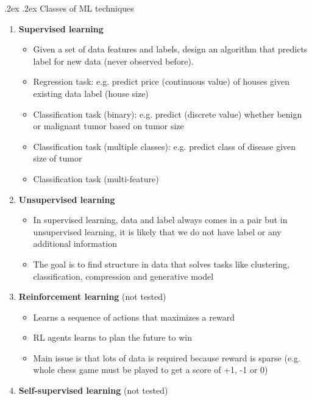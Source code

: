 \documentclass[landscape,a4paper]{article}
\makeatletter
\renewcommand{\subsection}{\@startsection{subsection}{1}{0mm}%
	{.2ex}%
	{.2ex}%
	{\sffamily\bfseries}}
\makeatother
\begin{document}
\begin{multicols*}{4}
		\subsection{Classes of ML techniques}
		\begin{enumerate}
			\item \textbf{Supervised learning}
			\begin{itemize}
				\item Given a set of data features and labels, design an algorithm that predicts label for
				new data (never observed before).
				\item Regression task: e.g. predict price (continuous value) of houses given existing data label (house size)
				\item Classification task (binary): e.g. predict (discrete value) whether benign or malignant tumor based on tumor size
				\item Classification task (multiple classes): e.g. predict class of disease given size of tumor
				\item Classification task (multi-feature)
			\end{itemize}
			\item \textbf{Unsupervised learning}
			\begin{itemize}
				\item In supervised learning, data and label always comes in a pair but in unsupervised learning, it is likely that we do not have label or any additional information
				\item The goal is to find structure in data that solves tasks like clustering, classification, compression and generative model
			\end{itemize}
			\item \textbf{Reinforcement learning} (not tested)
			\begin{itemize}
				\item Learns a sequence of actions that maximizes a reward
				\item RL agents learns to plan the future to win
				\item Main issue is that lots of data is required because reward is sparse (e.g. whole chess game must be played to get a score of +1, -1 or 0)
			\end{itemize}
			\item \textbf{Self-supervised learning} (not tested)
		\end{enumerate}

\end{multicols*}
\end{document}
